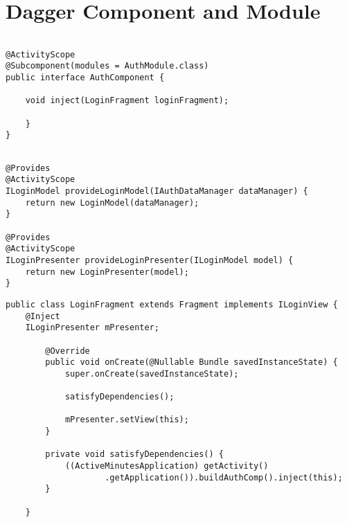 \chapter{Dagger Component and Module}
\label{chapter:dagger-component-module}
    
\begin{lstlisting}[caption=Dagger Component example,frame=tlrb,basicstyle=\small,captionpos=b]
    
@ActivityScope
@Subcomponent(modules = AuthModule.class)
public interface AuthComponent {

    void inject(LoginFragment loginFragment);
    
    }
}
\end{lstlisting}

\begin{lstlisting}[caption= Dagger Module example,frame=tlrbr,basicstyle=\small,captionpos=b]
    
@Provides
@ActivityScope
ILoginModel provideLoginModel(IAuthDataManager dataManager) {
    return new LoginModel(dataManager);
}

@Provides
@ActivityScope
ILoginPresenter provideLoginPresenter(ILoginModel model) {
    return new LoginPresenter(model);
}
\end{lstlisting}

\begin{lstlisting}[caption=Dependency injection example,
label=di-example,captionpos=b, frame=single,basicstyle=\small,float,floatplacement=H,breaklines=true]
    public class LoginFragment extends Fragment implements ILoginView {
    @Inject
    ILoginPresenter mPresenter;
    
        @Override
        public void onCreate(@Nullable Bundle savedInstanceState) {
            super.onCreate(savedInstanceState);
            
            satisfyDependencies();
            
            mPresenter.setView(this);
        }
        
        private void satisfyDependencies() {
            ((ActiveMinutesApplication) getActivity()
                    .getApplication()).buildAuthComp().inject(this);
        }
    
    }
    \end{lstlisting}





  